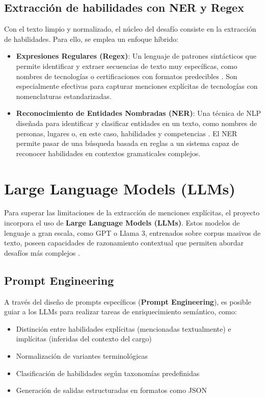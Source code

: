 \subsection{Extracción de habilidades con NER y Regex}

Con el texto limpio y normalizado, el núcleo del desafío consiste en la extracción de habilidades. Para ello, se emplea un enfoque híbrido:

\begin{itemize}
    \item \textbf{Expresiones Regulares (Regex)}: Un lenguaje de patrones sintácticos que permite identificar y extraer secuencias de texto muy específicas, como nombres de tecnologías o certificaciones con formatos predecibles \cite{lukauskas2023}. Son especialmente efectivas para capturar menciones explícitas de tecnologías con nomenclaturas estandarizadas.

    \item \textbf{Reconocimiento de Entidades Nombradas (NER)}: Una técnica de NLP diseñada para identificar y clasificar entidades en un texto, como nombres de personas, lugares o, en este caso, habilidades y competencias \cite{herandi2024}. El NER permite pasar de una búsqueda basada en reglas a un sistema capaz de reconocer habilidades en contextos gramaticales complejos.
\end{itemize}

\section{Large Language Models (LLMs)}

Para superar las limitaciones de la extracción de menciones explícitas, el proyecto incorpora el uso de \textbf{Large Language Models (LLMs)}. Estos modelos de lenguaje a gran escala, como GPT o Llama 3, entrenados sobre corpus masivos de texto, poseen capacidades de razonamiento contextual que permiten abordar desafíos más complejos \cite{herandi2024}.

\subsection{Prompt Engineering}

A través del diseño de prompts específicos (\textbf{Prompt Engineering}), es posible guiar a los LLMs para realizar tareas de enriquecimiento semántico, como:

\begin{itemize}
    \item Distinción entre habilidades explícitas (mencionadas textualmente) e implícitas (inferidas del contexto del cargo) \cite{nguyen2024}
    \item Normalización de variantes terminológicas
    \item Clasificación de habilidades según taxonomías predefinidas
    \item Generación de salidas estructuradas en formatos como JSON
\end{itemize}

